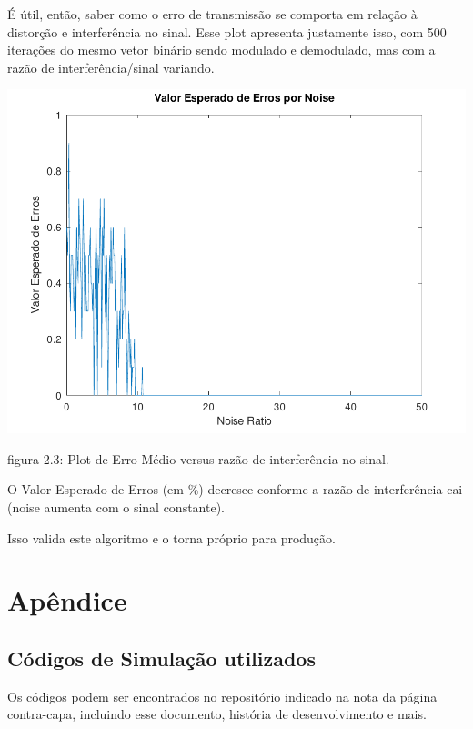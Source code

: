 \documentclass[11pt,a4paper]{report}
\begin{document}
	É útil, então, saber como o erro de transmissão se comporta em relação à distorção e interferência no sinal. Esse plot apresenta justamente isso, com 500 iterações do mesmo vetor binário sendo modulado e demodulado, mas com a razão de interferência/sinal variando. 
	\begin{center}

		\includegraphics[clip, trim=0.0cm 0cm 0.0cm 0.0cm, 								width=1.00\textwidth]{errorplot}
	\end{center}
\begin{center}
	{\footnotesize figura 2.3: Plot de Erro Médio versus razão de interferência no sinal.}
\end{center}

	O Valor Esperado de Erros (em $\%$) decresce conforme a razão de interferência cai (noise aumenta com o sinal constante). \newline
	
	Isso valida este algoritmo e o torna próprio para produção.
	\newpage
\chapter{Apêndice}
\section{Códigos de Simulação utilizados}
Os códigos podem ser encontrados no repositório indicado na nota da página contra-capa, incluindo esse documento, história de desenvolvimento e mais.
\end{document}
